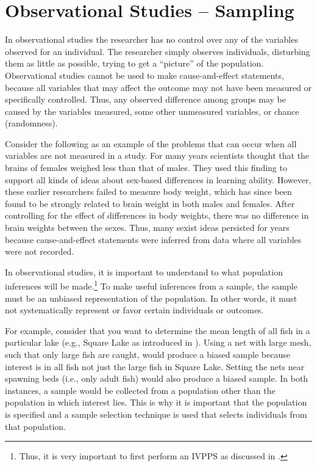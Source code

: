\documentclass[10pt,openany]{book}\usepackage[]{graphicx}\usepackage[]{color}
\begin{document}
\section{Observational Studies -- Sampling}
In observational studies the researcher has no control over any of the variables observed for an individual.  The researcher simply observes individuals, disturbing them as little as possible, trying to get a ``picture'' of the population.  Observational studies cannot be used to make cause-and-effect statements, because all variables that may affect the outcome may not have been measured or specifically controlled.  Thus, any observed difference among groups may be caused by the variables measured, some other unmeasured variables, or chance (randomness).

Consider the following as an example of the problems that can occur when all variables are not measured in a study.  For many years scientists thought that the brains of females weighed less than that of males.  They used this finding to support all kinds of ideas about sex-based differences in learning ability.  However, these earlier researchers failed to measure body weight, which has since been found to be strongly related to brain weight in both males and females.  After controlling for the effect of differences in body weights, there was no difference in brain weights between the sexes.  Thus, many sexist ideas persisted for years because cause-and-effect statements were inferred from data where all variables were not recorded.


In observational studies, it is important to understand to what population inferences will be made.\footnote{Thus, it is very important to first perform an IVPPS as discussed in .}  To make useful inferences from a sample, the sample must be an unbiased representation of the population.  In other words, it must not systematically represent or favor certain individuals or outcomes.

For example, consider that you want to determine the mean length of all fish in a particular lake (e.g., Square Lake as introduced in ).  Using a net with large mesh, such that only large fish are caught, would produce a biased sample because interest is in all fish not just the large fish in Square Lake.  Setting the nets near spawning beds (i.e., only adult fish) would also produce a biased sample.  In both instances, a sample would be collected from a population other than the population in which interest lies.  This is why it is important that the population is specified and a sample selection technique is used that selects individuals from that population.
\end{document}
